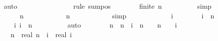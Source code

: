 \begin{isabellebody}
\ \ \ \ \ \ \isamarkupfalse%
\ auto\isanewline
\ \ \ \ \isamarkupfalse%
\ \isamarkupfalse%
\ {\isachardoublequoteopen}{\isachardot}{\isachardot}{\isachardot}\ {\isachargreater}\ {}{\isachardoublequoteclose}\isanewline
\ \ \ \ \isamarkupfalse%
\ {\isacharparenleft}rule\ sum{\isacharunderscore}pos{\isacharparenright}\isanewline
\ \ \ \ \ \ \isamarkupfalse%
\ {\isachardoublequoteopen}finite\ {\isacharbraceleft}{}{\isachardot}{\isachardot}{\isacharless}n{\isacharbraceright}{\isachardoublequoteclose}\isanewline
\ \ \ \ \ \ \ \ \isamarkupfalse%
\ simp\isanewline
\ \ \ \ \isamarkupfalse%
\isanewline
\ \ \ \ \ \ \isamarkupfalse%
\ {\isachardoublequoteopen}{\isacharbraceleft}{}{\isachardot}{\isachardot}{\isacharless}n{\isacharbraceright}\ {\isasymnoteq}\ {\isacharbraceleft}{\isacharbraceright}{\isachardoublequoteclose}\isanewline
\ \ \ \ \ \ \ \ \isamarkupfalse%
\ {\isacharbackquoteopen}n\ {\isachargreater}\ {}{\isacharbackquoteclose}\isanewline
\ \ \ \ \ \ \ \ \isamarkupfalse%
\ simp\isanewline
\ \ \ \ \isamarkupfalse%
\isanewline
\ \ \ \ \ \ \isamarkupfalse%
\ i\isanewline
\ \ \ \ \ \ \isamarkupfalse%
\ {\isachardoublequoteopen}i\ {\isasymin}\ {\isacharbraceleft}{}{\isachardot}{\isachardot}{\isacharless}n{\isacharbraceright}{\isachardoublequoteclose}\isanewline
\ \ \ \ \ \ \isamarkupfalse%
\ {\isacharasterisk}{\isacharcolon}\ {\isachardoublequoteopen}{}\ {\isasymle}\ i{\isachardoublequoteclose}\ {\isachardoublequoteopen}i\ {\isacharless}\ n{\isachardoublequoteclose}\isanewline
\ \ \ \ \ \ \ \ \isamarkupfalse%
\ auto\isanewline
\ \ \ \ \ \ \isamarkupfalse%
\ {\isachardoublequoteopen}{\isacharparenleft}n\ {\isacharslash}\ {\isacharparenleft}n\ {\isacharminus}\ i{\isacharparenright}\ {\isacharminus}\ {\isacharparenleft}n\ {\isacharplus}\ {}{\isacharparenright}\ {\isacharslash}\ {\isacharparenleft}n\ {\isacharplus}\ {}\ {\isacharminus}\ i{\isacharparenright}{\isacharparenright}\ {\isachargreater}\ {}{\isachardoublequoteclose}\isanewline
\ \ \ \ \ \ \isamarkupfalse%
{\isacharminus}\isanewline
\ \ \ \ \ \ \ \ \isamarkupfalse%
\ {\isacharquery}n\ {\isacharequal}\ {\isachardoublequoteopen}real\ n{\isachardoublequoteclose}\ \ {\isacharquery}i\ {\isacharequal}\ {\isachardoublequoteopen}real\ i{\isachardoublequoteclose}\isanewline

\end{isabellebody}
